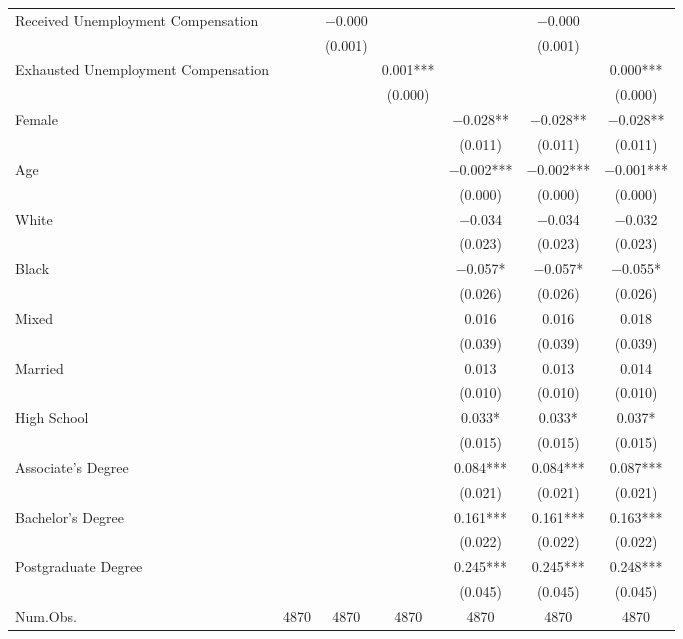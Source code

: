 \documentclass[
]{article}
\begin{document}
\begin{table}
{\begin{tabular}[t]{lcccccc}
Received
Unemployment
Compensation &  & \num{-0.000} &  &  & \num{-0.000} & \\
 &  & (\num{0.001}) &  &  & (\num{0.001}) & \\
Exhausted
Unemployment
Compensation &  &  & \num{0.001}*** &  &  & \num{0.000}***\\
 &  &  & (\num{0.000}) &  &  & (\num{0.000})\\
Female &  &  &  & \num{-0.028}** & \num{-0.028}** & \num{-0.028}**\\
 &  &  &  & (\num{0.011}) & (\num{0.011}) & (\num{0.011})\\
Age &  &  &  & \num{-0.002}*** & \num{-0.002}*** & \num{-0.001}***\\
 &  &  &  & (\num{0.000}) & (\num{0.000}) & (\num{0.000})\\
White &  &  &  & \num{-0.034} & \num{-0.034} & \num{-0.032}\\
 &  &  &  & (\num{0.023}) & (\num{0.023}) & (\num{0.023})\\
Black &  &  &  & \num{-0.057}* & \num{-0.057}* & \num{-0.055}*\\
 &  &  &  & (\num{0.026}) & (\num{0.026}) & (\num{0.026})\\
Mixed &  &  &  & \num{0.016} & \num{0.016} & \num{0.018}\\
 &  &  &  & (\num{0.039}) & (\num{0.039}) & (\num{0.039})\\
Married &  &  &  & \num{0.013} & \num{0.013} & \num{0.014}\\
 &  &  &  & (\num{0.010}) & (\num{0.010}) & (\num{0.010})\\
High
School &  &  &  & \num{0.033}* & \num{0.033}* & \num{0.037}*\\
 &  &  &  & (\num{0.015}) & (\num{0.015}) & (\num{0.015})\\
Associate's
Degree &  &  &  & \num{0.084}*** & \num{0.084}*** & \num{0.087}***\\
 &  &  &  & (\num{0.021}) & (\num{0.021}) & (\num{0.021})\\
Bachelor's
Degree &  &  &  & \num{0.161}*** & \num{0.161}*** & \num{0.163}***\\
 &  &  &  & (\num{0.022}) & (\num{0.022}) & (\num{0.022})\\
Postgraduate
Degree &  &  &  & \num{0.245}*** & \num{0.245}*** & \num{0.248}***\\
 &  &  &  & (\num{0.045}) & (\num{0.045}) & (\num{0.045})\\
\midrule
Num.Obs. & \num{4870} & \num{4870} & \num{4870} & \num{4870} & \num{4870} & \num{4870}\\

\end{tabular}}
\end{table}
\end{document}
